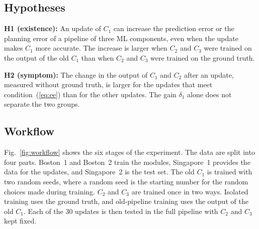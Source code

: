 \documentclass[conference]{IEEEtran}
\begin{document}
\subsection{Hypotheses}
\noindent\textbf{H1 (existence):} An update of $C_1$ can increase the
prediction error or the planning error of a pipeline of three ML components,
even when the update makes $C_1$ more accurate. The increase is larger when
$C_2$ and $C_3$ were trained on the output of the old $C_1$ than when $C_2$ and
$C_3$ were trained on the ground truth.

\noindent\textbf{H2 (symptom):} The change in the output of $C_1$ and $C_2$
after an update, measured without ground truth, is larger for the updates that
meet condition~(\ref{eq:ee}) than for the other updates. The gain $\delta_1$ alone does not separate the two groups.

\subsection{Workflow}
Fig.~\ref{fig:workflow} shows the six stages of the experiment. The data are
split into four parts. Boston~1 and Boston~2 train the modules, Singapore~1
provides the data for the updates, and Singapore~2 is the test set. The old
$C_1$ is trained with two random seeds, where a random seed is the starting number
for the random choices made during training. $C_2$ and $C_3$ are trained once in two ways. Isolated training uses the ground truth, and old-pipeline training uses the output of the old $C_1$. Each of the 30 updates is then tested in the full pipeline
with $C_2$ and $C_3$ kept fixed.
\end{document}
